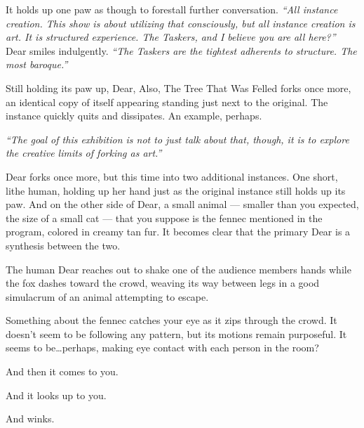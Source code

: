 It holds up one paw as though to forestall further conversation. \emph{``All instance creation. This show is about utilizing that consciously, but all instance creation is art. It is structured experience. The Taskers, and I believe you are all here?''} Dear smiles indulgently. \emph{``The Taskers are the tightest adherents to structure. The most baroque.''}

Still holding its paw up, Dear, Also, The Tree That Was Felled forks once more, an identical copy of itself appearing standing just next to the original. The instance quickly quits and dissipates. An example, perhaps.

\emph{``The goal of this exhibition is not to just talk about that, though, it is to explore the creative limits of forking as art.''}

Dear forks once more, but this time into two additional instances. One short, lithe human, holding up her hand just as the original instance still holds up its paw. And on the other side of Dear, a small animal --- smaller than you expected, the size of a small cat --- that you suppose is the fennec mentioned in the program, colored in creamy tan fur. It becomes clear that the primary Dear is a synthesis between the two.

The human Dear reaches out to shake one of the audience members hands while the fox dashes toward the crowd, weaving its way between legs in a good simulacrum of an animal attempting to escape.


Something about the fennec catches your eye as it zips through the crowd. It doesn't seem to be following any pattern, but its motions remain purposeful. It seems to be\ldots{}perhaps, making eye contact with each person in the room?

\newpage

\null
\vfill

And then it comes to you.

\null
\vfill

\newpage

\null
\vfill

And it looks up to you.

\null
\vfill

\newpage

\null
\vfill

And winks.

\null
\vfill

\newpage

